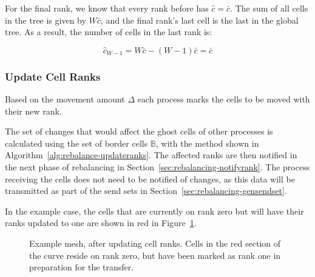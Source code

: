 \documentclass[twoside]{IIBproject}
\numberwithin{figure}{section}
\begin{document}
            For the final rank, we know that every rank before has $\hat c=\bar c$. The sum of all cells in the tree is given by $W\bar c$, and the final rank's last cell is the last in the global tree. As a result, the number of cells in the last rank is:

            \begin{equation}
                \hat c_{W-1}=W\bar c - (W-1)\bar c=\bar c
            \end{equation}



        \subsubsection{Update Cell Ranks} %
            \label{sec:rebalancing-updatecellranks}

            Based on the movement amount $\Delta$ each process marks the cells to be moved with their new rank.

            The set of changes that would affect the ghost cells of other processes is calculated using the set of border cells $\mathbb{B}$, with the method shown in Algorithm~\ref{alg:rebalance-updateranks}. The affected ranks are then notified in the next phase of rebalancing in Section~\ref{sec:rebalancing-notifyrank}. The process receiving the cells does not need to be notified of changes, as this data will be transmitted as part of the send sets in Section~\ref{sec:rebalancing-gensendset}.

            In the example case, the cells that are currently on rank zero but will have their ranks updated to one are shown in red in Figure~\ref{fig:rebalance-ranks}.

            \begin{figure}[!htbp]
                
                \caption{Example mesh, after updating cell ranks. Cells in the red section of the curve reside on rank zero, but have been marked as rank one in preparation for the transfer.}
                \label{fig:rebalance-ranks}
            \end{figure}
\end{document}
